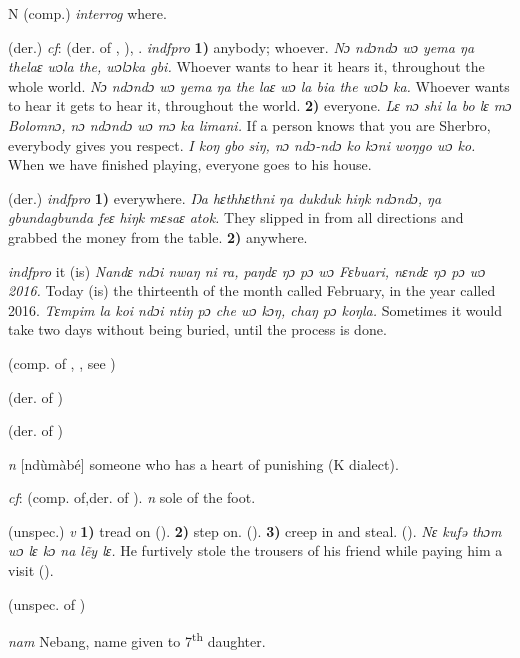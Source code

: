 \begin{letter}{N}
 (comp.) \textit{interrog} where.

 (der.) \textit{cf}:  (der. of , ), . \textit{indfpro} \textbf{1)} anybody; whoever. \textit{Nɔ ndɔndɔ wɔ yema ŋa thelaɛ wɔla the, wɔlɔka gbi.} Whoever wants to hear it hears it, throughout the whole world. \textit{Nɔ ndɔndɔ wɔ yema ŋa the laɛ wɔ la bia the wɔlɔ ka.} Whoever wants to hear it gets to hear it, throughout the world. \textbf{2)} everyone. \textit{Lɛ nɔ shi la bo lɛ mɔ Bolomnɔ, nɔ ndɔndɔ wɔ mɔ ka limani.} If a person knows that you are Sherbro, everybody gives you respect. \textit{I koŋ gbo siŋ, nɔ ndɔ-ndɔ ko kɔni woŋgo wɔ ko.} When we have finished playing, everyone goes to his house.

 (der.) \textit{indfpro} \textbf{1)} everywhere. \textit{Ŋa hɛthhɛthni ŋa dukduk hiŋk ndɔndɔ, ŋa gbundagbunda feɛ hiŋk mɛsaɛ atok.} They slipped in from all directions and grabbed the money from the table. \textbf{2)} anywhere.

 \textit{indfpro} it (is) \textit{Nandɛ ndɔi nwaŋ ni ra, paŋdɛ ŋɔ pɔ wɔ Fɛbuari, nɛndɛ ŋɔ pɔ wɔ 2016.} Today (is) the thirteenth of the month called February, in the year called 2016. \textit{Tɛmpim la koi ndɔi ntiŋ pɔ che wɔ kɔŋ, chaŋ pɔ koŋla.} Sometimes it would take two days without being buried, until the process is done.

 (comp. of , , see ) 

 (der. of ) 

 (der. of ) 

 \textit{n} [ndùmàbé] someone who has a heart of punishing (K dialect). 

 \textit{cf}:  (comp. of,der. of ). \textit{n} sole of the foot.

 (unspec.) \textit{v} \textbf{1)} tread on (\citealt{Pichl1967}). \textbf{2)} step on. (\citealt{Sumner1921}). \textbf{3)} creep in and steal. (\citealt{Pichl1967}). \textit{Nɛ kufə thɔm wɔ lɛ kɔ na lẽy lɛ.} He furtively stole the trousers of his friend while paying him a visit (\citealt{Pichl1967}).

 (unspec. of ) 

 \textit{nam} Nebang, name given to 7\textsuperscript{th} daughter.


\end{letter}
